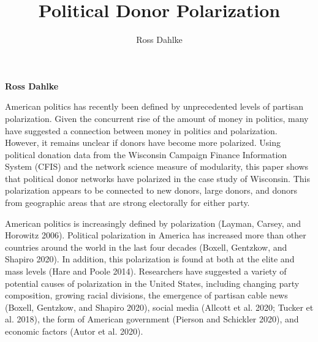 \documentclass[12pt,]{article}
\title{Political Donor Polarization  }
\author{\Large Ross Dahlke\vspace{0.05in} \newline\normalsize\emph{}  }
\date{}
\newcommand*{\authorfont}{\fontfamily{phv}\selectfont}
\renewenvironment{abstract}
 {{%
    \setlength{\leftmargin}{0mm}
    \setlength{\rightmargin}{\leftmargin}%
  }%
  \relax}
 {\endlist}
\begin{document}
	
%

{%
\setlength{\parindent}{0pt}
\thispagestyle{plain}
{\fontsize{18}{20}\selectfont\raggedright 
\maketitle  %

}

{
   \vskip 13.5pt\relax \normalsize\fontsize{11}{12} 
\textbf{\authorfont Ross Dahlke} \hskip 15pt \emph{\small }   

}

}








\begin{abstract}

    \hbox{\vrule height .2pt width 39.14pc}

    \vskip 8.5pt %

\noindent American politics has recently been defined by unprecedented levels of
partisan polarization. Given the concurrent rise of the amount of money
in politics, many have suggested a connection between money in politics
and polarization. However, it remains unclear if donors have become more
polarized. Using political donation data from the Wisconsin Campaign
Finance Information System (CFIS) and the network science measure of
modularity, this paper shows that political donor networks have
polarized in the case study of Wisconsin. This polarization appears to
be connected to new donors, large donors, and donors from geographic
areas that are strong electorally for either party.


    \hbox{\vrule height .2pt width 39.14pc}


\end{abstract}


\vskip -8.5pt



\noindent \doublespacing 

\newpage

American politics is increasingly defined by polarization (Layman,
Carsey, and Horowitz 2006). Political polarization in America has
increased more than other countries around the world in the last four
decades (Boxell, Gentzkow, and Shapiro 2020). In addition, this
polarization is found at both at the elite and mass levels (Hare and
Poole 2014). Researchers have suggested a variety of potential causes of
polarization in the United States, including changing party composition,
growing racial divisions, the emergence of partisan cable news (Boxell,
Gentzkow, and Shapiro 2020), social media (Allcott et al. 2020; Tucker
et al. 2018), the form of American government (Pierson and Schickler
2020), and economic factors (Autor et al. 2020).
\end{document}
